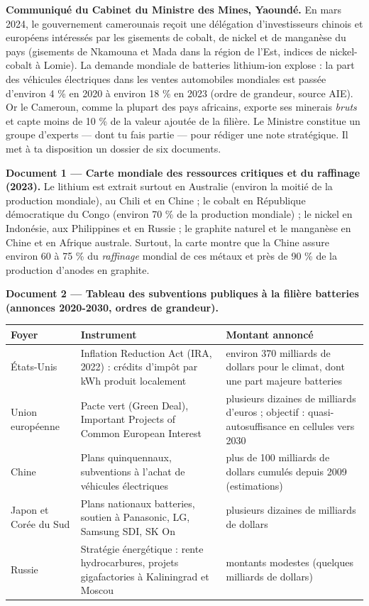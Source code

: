 \documentclass[11pt]{article}
\newcommand{\cle}[1]{{\popxbold\color{popdark}#1}}
\newcounter{popsec}
\newcounter{popsub}
\newcommand{\courssub}[1]{%
  \stepcounter{popsub}%
  \par\vspace{9pt}\noindent{\popxbold\fontsize{11.5}{13}\selectfont\color{popink}{\color{poporange}\thepopsec.\thepopsub}\hspace{6pt}#1}\par\nopagebreak\vspace{4pt}
}
\begin{document}
\courssub{Situation}

\textbf{Communiqué du Cabinet du Ministre des Mines, Yaoundé.} En mars 2024, le gouvernement camerounais reçoit une délégation d'investisseurs chinois et européens intéressés par les gisements de \cle{cobalt}, de \cle{nickel} et de \cle{manganèse} du pays (gisements de Nkamouna et Mada dans la région de l'Est, indices de nickel-cobalt à Lomie). La demande mondiale de batteries lithium-ion explose : la part des véhicules électriques dans les ventes automobiles mondiales est passée d'environ 4 \% en 2020 à environ 18 \% en 2023 (ordre de grandeur, source AIE). Or le Cameroun, comme la plupart des pays africains, exporte ses minerais \emph{bruts} et capte moins de 10 \% de la valeur ajoutée de la filière. Le Ministre constitue un groupe d'experts — dont tu fais partie — pour rédiger une note stratégique. Il met à ta disposition un dossier de six documents.

\textbf{Document 1 — Carte mondiale des ressources critiques et du raffinage (2023).} Le lithium est extrait surtout en Australie (environ la moitié de la production mondiale), au Chili et en Chine ; le cobalt en République démocratique du Congo (environ 70 \% de la production mondiale) ; le nickel en Indonésie, aux Philippines et en Russie ; le graphite naturel et le manganèse en Chine et en Afrique australe. Surtout, la carte montre que la \cle{Chine} assure environ 60 à 75 \% du \emph{raffinage} mondial de ces métaux et près de 90 \% de la production d'anodes en graphite.

\textbf{Document 2 — Tableau des subventions publiques à la filière batteries (annonces 2020-2030, ordres de grandeur).}

\begin{center}
\begin{tabularx}{\linewidth}{|l|X|X|}\hline
\rowcolor{popblueL} \textbf{Foyer} & \textbf{Instrument} & \textbf{Montant annoncé} \\ \hline
États-Unis & Inflation Reduction Act (IRA, 2022) : crédits d'impôt par kWh produit localement & environ 370 milliards de dollars pour le climat, dont une part majeure batteries \\ \hline
Union européenne & Pacte vert (Green Deal), Important Projects of Common European Interest & plusieurs dizaines de milliards d'euros ; objectif : quasi-autosuffisance en cellules vers 2030 \\ \hline
Chine & Plans quinquennaux, subventions à l'achat de véhicules électriques & plus de 100 milliards de dollars cumulés depuis 2009 (estimations) \\ \hline
Japon et Corée du Sud & Plans nationaux batteries, soutien à Panasonic, LG, Samsung SDI, SK On & plusieurs dizaines de milliards de dollars \\ \hline
Russie & Stratégie énergétique : rente hydrocarbures, projets gigafactories à Kaliningrad et Moscou & montants modestes (quelques milliards de dollars) \\ \hline
\end{tabularx}
\end{center}
\end{document}
